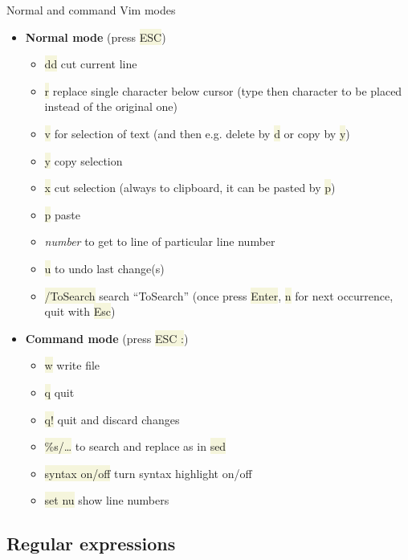 \documentclass[compress, xelatex, 11pt, xcolor=svgnames, aspectratio=169,
	hyperref={
		bookmarks=true,
		unicode=true,
		colorlinks=true,
		pdftitle={Linux, command line and MetaCentrum},
		plainpages=false,
		pdfauthor={Vojtech Zeisek},
		pdfsubject={Course about use of Linux command line, writing shell scripts and using MetaCentrum of CESNET},
		pdfcreator={XeLaTeX},
		pdfkeywords={Linux, GNU, BASH, shell, command line, MetaCentrum},
		linkcolor=DarkRed, %
		anchorcolor=DarkBlue, %
		citecolor=Indigo, %
		filecolor=NavyBlue, %
		menucolor=DarkMagenta, %
		urlcolor=DarkBlue, %
		},
	url={hyphens, lowtilde} %
	]{beamer}
\renewcommand{\texttt}[1]{\colorbox{Beige}{{\ttfamily #1}}}
\begin{document}
\begin{frame}{Normal and command Vim modes}
	\begin{multicols}{2}
		\begin{itemize}
			\item \textbf{Normal mode} (press \texttt{ESC})
			\begin{itemize}
				\item \texttt{dd} cut current line
				\item \texttt{r} replace single character below cursor (type then character to be placed instead of the original one)
				\item \texttt{v} for selection of text (and then e.g. delete by \texttt{d} or copy by \texttt{y})
				\item \texttt{y} copy selection
				\item \texttt{x} cut selection (always to clipboard, it can be pasted by \texttt{p})
				\item \texttt{p} paste
				\item \textit{number} to get to line of particular line number
				\item \texttt{u} to undo last change(s)
				\item \texttt{/ToSearch} search \enquote{ToSearch} (once press \texttt{Enter}, \texttt{n} for next occurrence, quit with \texttt{Esc})
			\end{itemize}
			\item \textbf{Command mode} (press \texttt{ESC :})
			\begin{itemize}
				\item \texttt{w} write file
				\item \texttt{q} quit
				\item \texttt{q!} quit and discard changes
				\item \texttt{\%s/\ldots} to search and replace as in \texttt{sed}
				\item \texttt{syntax on/off} turn syntax highlight on/off
				\item \texttt{set nu} show line numbers
			\end{itemize}
		\end{itemize}
	\end{multicols}
\end{frame}

\subsection{Regular expressions}
\end{document}
